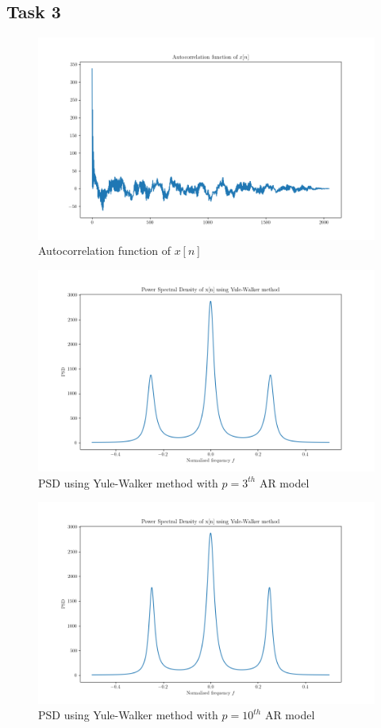 \documentclass{article}
\begin{document}
\subsection{Task 3}
\begin{figure}[!ht]
\includegraphics[width=\textwidth]{ACF.png}
\caption{Autocorrelation function of $x[n]$}
\label{fig:acf}
\end{figure}

\begin{figure}[!ht]
\includegraphics[width=\textwidth]{PSD_YW_3.png}
\caption{PSD using Yule-Walker method with $p=3^{th}$ AR model}
\label{fig:psdyw3}
\end{figure}

\begin{figure}[!ht]
\includegraphics[width=\textwidth]{PSD_YW_10.png}
\caption{PSD using Yule-Walker method with $p=10^{th}$ AR model}
\label{fig:psdyw10}
\end{figure}
\end{document}

